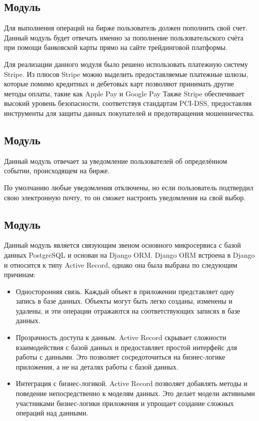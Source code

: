 \subsection{Модуль \moduleStripe}\label{subsec:sys:stripe}
Для выполнения операций на бирже пользователь должен пополнить свой счет.
Данный модуль будет отвечать именно за пополнение пользовательского счёта при помощи банковской карты прямо на сайте трейдинговой платформы.

Для реализации данного модуля было решено использовать платежную систему Stripe.
Из плюсов Stripe можно выделить предоставляемые платежные шлюзы, которые помимо кредитных и дебетовых карт позволяют принимать другие методы оплаты, такие как Apple Pay и Google Pay
Также Stripe обеспечивает высокий уровень безопасности, соответствуя стандартам PCI-DSS, предоставляя инструменты для защиты данных покупателей и предотвращения мошенничества.


\subsection{Модуль \moduleNotifications}\label{subsec:-module-notifications}
Данный модуль отвечает за уведомление пользователей об определённом событии, происходящем на бирже.

По умолчанию любые уведомления отключены, но если пользователь подтвердил свою электронную почту, то он сможет настроить уведомления на свой выбор.


\subsection{Модуль \moduleCommunicationPostgres}\label{subsec:sys:module-communication-postgres}
Данный модуль является связующим звеном основного микросервиса с базой данных PostgreSQL и основан на Django ORM.
Django ORM встроена в Django и относится к типу Active Record, однако она была выбрана по следующим причинам:
\begin{itemize}
    \item Односторонняя связь.
    Каждый объект в приложении представляет одну запись в базе данных.
    Объекты могут быть легко созданы, изменены и удалены, и эти операции отражаются на соответствующих записях в базе данных.
    \item Прозрачность доступа к данным.
    Active Record скрывает сложности взаимодействия с базой данных и предоставляет простой интерфейс для работы с данными.
    Это позволяет сосредоточиться на бизнес-логике приложения, а не на деталях работы с базой данных.
    \item Интеграция с бизнес-логикой.
    Active Record позволяет добавлять методы и поведение непосредственно к моделям данных.
    Это делает модели активными участниками бизнес-логики приложения и упрощает создание сложных операций над данными.
\end{itemize}

